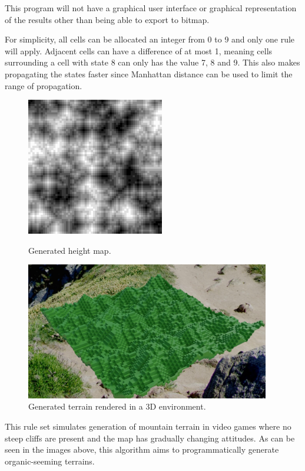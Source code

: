 This program will not have a graphical user interface or graphical representation of the results other than being able to export to bitmap. 

For simplicity, all cells can be allocated an integer from 0 to 9 and only one rule will apply. Adjacent cells can have a difference of at most 1, meaning cells surrounding a cell with state 8 can only has the value 7, 8 and 9. This also makes propagating the states faster since Manhattan distance can be used to limit the range of propagation.

\begin{figure}[!htb]
    \centering
    \includegraphics[height=6cm,keepaspectratio]{images/saved_result 64.png}
    \caption{Generated height map.}
    \endminipage\hfill
    \centering
    \includegraphics[height=6cm,keepaspectratio]{images/rendered_result_64.png}
    \caption{Generated terrain rendered in a 3D environment.}
    \endminipage\hfill
\end{figure}

    
This rule set simulates generation of mountain terrain in video games where no steep cliffs are present and the map has gradually changing attitudes. As can be seen in the images above, this algorithm aims to programmatically generate organic-seeming terrains.